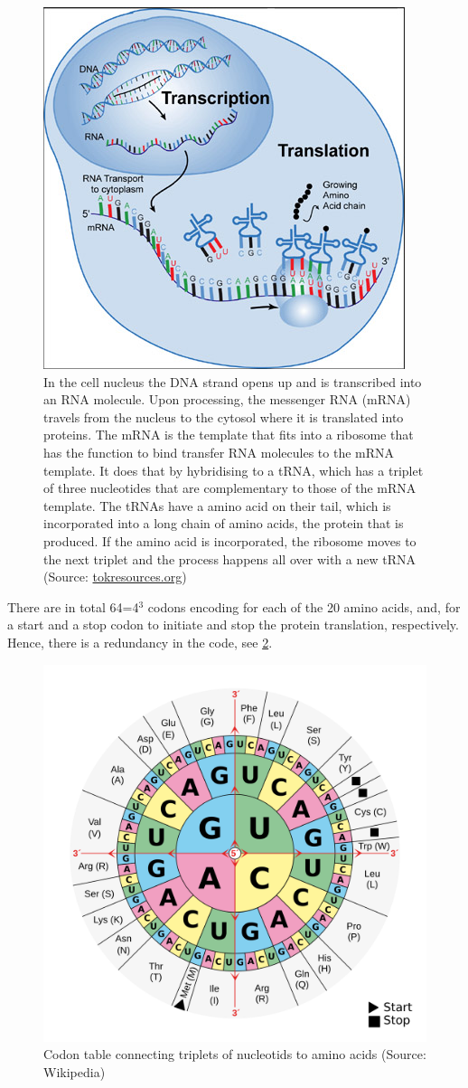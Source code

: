 \documentclass[
  11pt,
]{book}
\begin{document}
\begin{figure}

{\centering \includegraphics[width=0.5\linewidth]{./figs/transcription_2} 

}

\caption{In the cell nucleus the DNA strand opens up and is transcribed into an RNA molecule. Upon processing, the messenger RNA (mRNA) travels from the nucleus to the cytosol where it is translated into proteins. The mRNA is the template that fits into a ribosome that has the function to bind transfer RNA molecules to the mRNA template. It does that by hybridising to a tRNA, which has a triplet of three nucleotides that are complementary to those of the mRNA template. The tRNAs have a amino acid on their tail, which is incorporated into a long chain of amino acids, the protein that is produced. If the amino acid is incorporated, the ribosome moves to the next triplet and the process happens all over with a new tRNA (Source: \href{http://www.tokresource.org/tok_classes/biobiobio/biomenu/transcription_translation/}{tokresources.org})}\label{fig:transcriptionTranslation}
\end{figure}

There are in total 64=4\(^3\) codons encoding for each of the 20 amino acids, and, for a start and a stop codon to initiate and stop the protein translation, respectively. Hence, there is a redundancy in the code, see \ref{fig:codonTable}.

\begin{figure}

{\centering \includegraphics[width=0.5\linewidth]{./figs/Aminoacids_table} 

}

\caption{Codon table connecting triplets of nucleotids to amino acids (Source: Wikipedia)}\label{fig:codonTable}
\end{figure}
\end{document}
